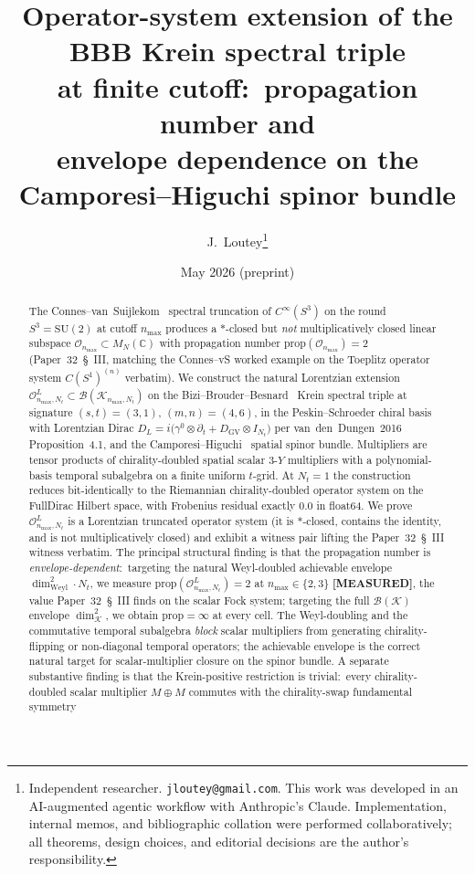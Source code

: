 \documentclass[11pt,a4paper]{article}
\title{Operator-system extension of the BBB Krein spectral triple\\
at finite cutoff:\ propagation number and\\
envelope dependence on the Camporesi--Higuchi spinor bundle}
\author{J.~Loutey\thanks{Independent researcher. \texttt{jloutey@gmail.com}.
This work was developed in an AI-augmented agentic workflow with
Anthropic's Claude. Implementation, internal memos, and bibliographic
collation were performed collaboratively; all theorems, design choices,
and editorial decisions are the author's responsibility.}}
\date{May 2026 (preprint)}
\theoremstyle{plain}
\theoremstyle{definition}
\newcommand{\nmax}{n_{\max}}
\newcommand{\Nt}{N_t}
\newcommand{\sthree}{S^{3}}
\newcommand{\Krein}{\mathcal{K}}
\newcommand{\Op}{\mathcal{O}}
\newcommand{\Bcal}{\mathcal{B}}
\newcommand{\C}{\mathbb{C}}
\newcommand{\SU}{\mathrm{SU}}
\newcommand{\Mat}{M}
\newcommand{\DGV}{D_{\mathrm{GV}}}
\newcommand{\DL}{D_L}
\newcommand{\prop}{\mathrm{prop}}
\newcommand{\Weyl}{\mathrm{Weyl}}
\begin{document}
\maketitle

\begin{abstract}
The Connes--van~Suijlekom~\cite{connes_vs2021} spectral truncation of
$C^\infty(\sthree)$ on the round $\sthree = \SU(2)$ at cutoff $\nmax$
produces a $*$-closed but \emph{not} multiplicatively closed linear
subspace $\Op_{\nmax} \subset \Mat_{N}(\C)$ with propagation number
$\prop(\Op_{\nmax}) = 2$ (Paper~32~\S~III, matching the Connes--vS
worked example on the Toeplitz operator system $C(S^1)^{(n)}$
verbatim). We construct the natural Lorentzian extension
$\Op_{\nmax, \Nt}^L \subset \Bcal(\Krein_{\nmax, \Nt})$ on the
Bizi--Brouder--Besnard~\cite{bizi_brouder_besnard2018} Krein
spectral triple at signature $(s, t) = (3, 1)$, $(m, n) = (4, 6)$,
in the Peskin--Schroeder chiral basis with Lorentzian Dirac
$\DL = i\bigl(\gamma^0 \otimes \partial_t + \DGV \otimes I_{\Nt}\bigr)$
per van~den~Dungen~2016~\cite{vandungen2016} Proposition~4.1, and the
Camporesi--Higuchi~\cite{camporesi_higuchi1996} spatial spinor bundle.
Multipliers are tensor products of chirality-doubled spatial scalar
$3$-$Y$ multipliers with a polynomial-basis temporal subalgebra on a
finite uniform $t$-grid. At $\Nt = 1$ the construction reduces
bit-identically to the Riemannian chirality-doubled operator system on
the FullDirac Hilbert space, with Frobenius residual exactly $0.0$ in
float64. We prove $\Op_{\nmax, \Nt}^L$ is a Lorentzian truncated
operator system (it is $*$-closed, contains the identity, and is not
multiplicatively closed) and exhibit a witness pair lifting the
Paper~32~\S~III witness verbatim. The principal structural finding is
that the propagation number is \emph{envelope-dependent}:\ targeting
the natural Weyl-doubled achievable envelope $\dim_\Weyl^2 \cdot \Nt$,
we measure $\prop(\Op_{\nmax, \Nt}^L) = 2$ at $\nmax \in \{2, 3\}$
\textbf{[MEASURED]}, the value Paper~32~\S~III finds on the scalar Fock
system; targeting the full $\Bcal(\Krein)$
envelope $\dim_\Krein^2$, we obtain $\prop = \infty$ at every cell.
The Weyl-doubling and the commutative temporal subalgebra
\emph{block} scalar multipliers from generating chirality-flipping or
non-diagonal temporal operators; the achievable envelope is the
correct natural target for scalar-multiplier closure on the spinor
bundle. A separate substantive finding is that the Krein-positive
restriction is trivial:\ every chirality-doubled scalar multiplier
$M \oplus M$ commutes with the chirality-swap fundamental symmetry

\end{abstract}
\end{document}
